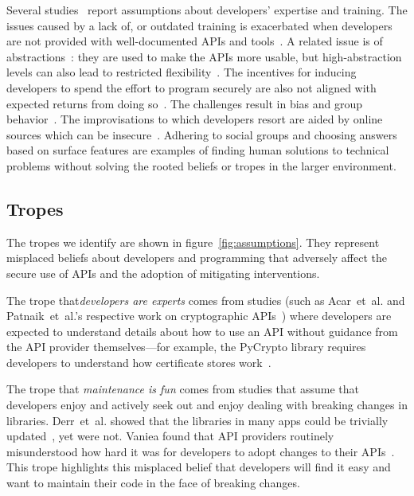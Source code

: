 \documentclass[conference]{IEEEtran}
\newcommand{\etal}[0]{et~al{.}}
\begin{document}
Several studies~\cite{zhu2014,tyler2015,whitney2015,lipford2016} report assumptions about developers' expertise and training. The issues caused by a lack of, or outdated training is exacerbated when developers are not provided with well-documented APIs and tools~\cite{Oliveira2018soups,acarusability2017,smith2020why}. A related issue is of abstractions~\cite{anderson2013,ranenberg2020}: they are used to make the APIs more usable,  but high-abstraction levels can also lead to restricted flexibility~\cite{loiacono2017ido}. The incentives for inducing developers to spend the effort to program securely are also not aligned with expected returns from doing so~\cite{erikacar2017,naiakshina2018}. The challenges result in bias and group behavior~\cite{emmasurface2020,acar2016infosources}. The improvisations to which developers resort are aided by online sources which can be insecure~\cite{fahl2012,linden2020,acar2016infosources}. Adhering to social groups and choosing answers based on surface features are examples of finding human solutions to technical problems without solving the rooted beliefs or tropes in the larger environment. 

\subsection {Tropes}

The tropes we identify are shown in figure~\ref{fig:assumptions}.  They represent misplaced beliefs about developers and programming that adversely affect the secure use of APIs and the adoption of mitigating interventions.

The trope that\emph{developers are experts} comes from studies (such as Acar~\etal{} and Patnaik~\etal{}'s respective work on cryptographic APIs~\cite{acarusability2017,patnaik2019}) where developers are expected to understand details about how to use an API without guidance from the API provider themselves---for example, the PyCrypto library requires developers to understand how certificate stores work~\cite{acarusability2017}.  

The trope that \emph{maintenance is fun} comes from studies that assume that developers enjoy and actively seek out and enjoy dealing with breaking changes in libraries.  Derr~\etal{} showed that the libraries in many apps could be trivially updated~\cite{erikacar2017}, yet were not.  Vaniea found that API providers routinely misunderstood how hard it was for developers to adopt changes to their APIs~\cite{vaniea2016}.  This trope highlights this misplaced belief that developers will find it easy and want to maintain their code in the face of breaking changes.
\end{document}
